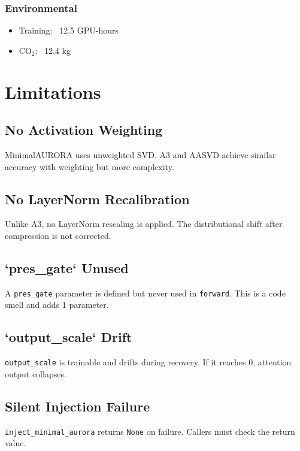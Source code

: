 \subsubsection{Environmental}
\begin{itemize}
\item Training: ~12.5 GPU-hours
\item CO$_2$: ~12.4 kg

\end{itemize}


\section{Limitations}

\subsection{No Activation Weighting}

MinimalAURORA uses unweighted SVD. A3 and AASVD achieve similar accuracy 
with weighting but more complexity.

\subsection{No LayerNorm Recalibration}

Unlike A3, no LayerNorm rescaling is applied. The distributional shift 
after compression is not corrected.

\subsection{`pres\_gate` Unused}

A \texttt{pres\_gate} parameter is defined but never used in \texttt{forward}. This is 
a code smell and adds 1 parameter.

\subsection{`output\_scale` Drift}

\texttt{output\_scale} is trainable and drifts during recovery. If it reaches 0, 
attention output collapses.

\subsection{Silent Injection Failure}

\texttt{inject\_minimal\_aurora} returns \texttt{None} on failure. Callers must check 
the return value.

